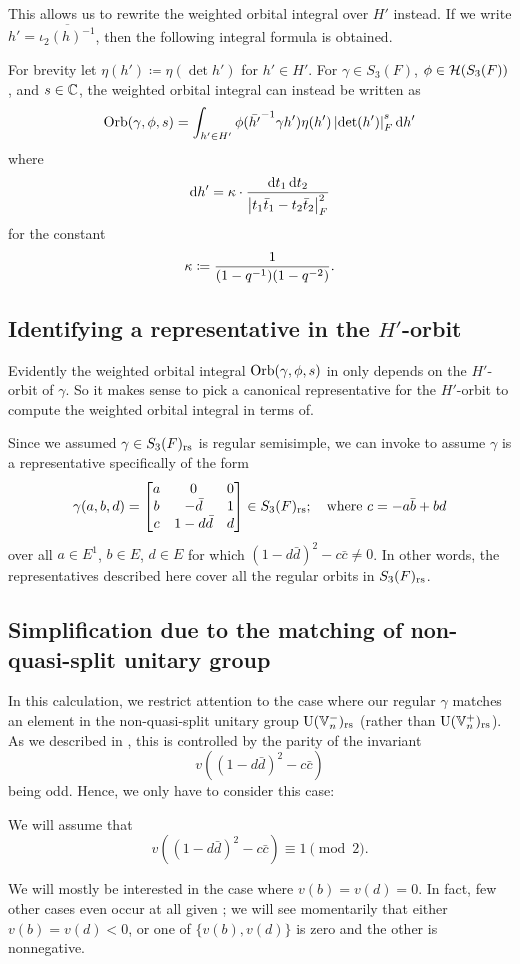 This allows us to rewrite the weighted orbital integral over $H'$ instead.
If we write $h' = \overline{\iota_2(h)^{-1}}$,
then the following integral formula is obtained.
\begin{proposition}
  \label{prop:orbital_over_H_prime}
  For brevity let $\eta(h') \coloneqq \eta(\det h')$ for $h' \in H'$.
  For $\gamma \in S_3(F)$, $\phi \in \mathcal H(S_3(F))$, and $s \in \mathbb C$,
  the weighted orbital integral can instead be written as
  \[ \Orb(\gamma, \phi, s) =
    \int_{h' \in H'} \phi(\bar{h'}\inv \gamma h') \eta(h')
    \left\lvert \det(h') \right\rvert_F^{s} \odif{h'} \]
  where
  \[ \odif{h'} = \kappa \cdot \frac{\odif t_1 \odif t_2}
    {\left\lvert t_1 \bar t_1 - t_2 \bar t_2 \right\rvert_F^2} \]
  for the constant
  \[ \kappa \coloneqq \frac{1}{(1-q^{-1})(1-q^{-2})}. \]
\end{proposition}

\subsection{Identifying a representative in the $H'$-orbit}
Evidently the weighted orbital integral $\operatorname{Orb}(\gamma, \phi, s)$ in 
only depends on the $H'$-orbit of $\gamma$.
So it makes sense to pick a canonical representative for the $H'$-orbit to compute
the weighted orbital integral in terms of.

Since we assumed $\gamma \in S_3(F)_{\mathrm{rs}}$ is regular semisimple,
we can invoke \cite[Proposition 4.1]{ref:AFL}
to assume $\gamma$ is a representative specifically of the form
\[ \gamma(a,b,d) =
  \begin{bmatrix}
    a & 0 & 0 \\
    b & - \bar d & 1 \\
    c & 1 - d \bar d & d
  \end{bmatrix}
  \in S_3(F)_{\mathrm{rs}}; \quad \text{where $c = -a \bar b + b d$} \]
over all $a \in E^1$, $b \in E$, $d \in E$ for which $(1-d\bar d)^2 - c \bar c \neq 0$.
In other words, the representatives described here cover all the regular orbits in $S_3(F)_{\mathrm{rs}}$.

\subsection{Simplification due to the matching of non-quasi-split unitary group}
In this calculation, we restrict attention to the case where our regular $\gamma$
matches an element in the non-quasi-split unitary group $\operatorname{U}(\mathbb V_n^-)_{\mathrm{rs}}$
(rather than $\operatorname{U}(\mathbb V_n^+)_{\mathrm{rs}}$).
As we described in ,
this is controlled by the parity of the invariant
\[ v\left( (1-d\bar d)^2 - c \bar c\right) \]
being odd.
Hence, we only have to consider this case:
\begin{assume}
  \label{assume:u_odd}
  We will assume that
  \[ v\left( (1-d\bar d)^2 - c \bar c\right) \equiv 1 \pmod 2. \]
\end{assume}
We will mostly be interested in the case where $v(b) = v(d) = 0$.
In fact, few other cases even occur at all given ;
we will see momentarily that either $v(b) = v(d) < 0$,
or one of $\{v(b), v(d)\}$ is zero and the other is nonnegative.

